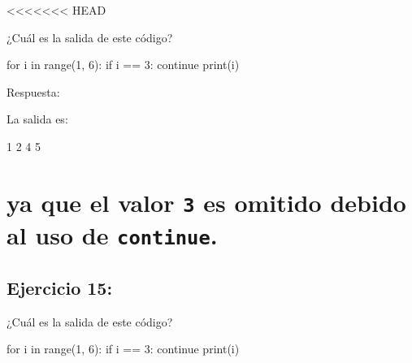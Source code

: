\documentclass[
  a4paper,
  DIV=11,
  numbers=noendperiod,
  onepage,
  openany]{scrreprt}
\newenvironment{Shaded}{\begin{snugshade}}{\end{snugshade}}
\newcommand{\BuiltInTok}[1]{\textcolor[rgb]{0.00,0.23,0.31}{#1}}
\newcommand{\ControlFlowTok}[1]{\textcolor[rgb]{0.00,0.23,0.31}{#1}}
\newcommand{\DecValTok}[1]{\textcolor[rgb]{0.68,0.00,0.00}{#1}}
\newcommand{\ExtensionTok}[1]{\textcolor[rgb]{0.00,0.23,0.31}{#1}}
\newcommand{\KeywordTok}[1]{\textcolor[rgb]{0.00,0.23,0.31}{#1}}
\newcommand{\NormalTok}[1]{\textcolor[rgb]{0.00,0.23,0.31}{#1}}
\newcommand{\OperatorTok}[1]{\textcolor[rgb]{0.37,0.37,0.37}{#1}}
\begin{document}
\textless\textless\textless\textless\textless\textless\textless{} HEAD

¿Cuál es la salida de este código?

\begin{Shaded}
\begin{Highlighting}[]
\ControlFlowTok{for}\NormalTok{ i }\KeywordTok{in} \BuiltInTok{range}\NormalTok{(}\DecValTok{1}\NormalTok{, }\DecValTok{6}\NormalTok{):}
    \ControlFlowTok{if}\NormalTok{ i }\OperatorTok{==} \DecValTok{3}\NormalTok{:}
        \ControlFlowTok{continue}
    \BuiltInTok{print}\NormalTok{(i)}
\end{Highlighting}
\end{Shaded}

Respuesta:

La salida es:

\begin{Shaded}
\begin{Highlighting}[]
\ExtensionTok{1}
\ExtensionTok{2}
\ExtensionTok{4}
\ExtensionTok{5}
\end{Highlighting}
\end{Shaded}

\hypertarget{ya-que-el-valor-3-es-omitido-debido-al-uso-de-continue.}{%
\chapter{\texorpdfstring{ya que el valor \texttt{3} es omitido debido al
uso de
\texttt{continue}.}{ya que el valor 3 es omitido debido al uso de continue.}}\label{ya-que-el-valor-3-es-omitido-debido-al-uso-de-continue.}}

\hypertarget{ejercicio-15-1}{%
\section{Ejercicio 15:}\label{ejercicio-15-1}}

¿Cuál es la salida de este código?

\begin{Shaded}
\begin{Highlighting}[]
\ControlFlowTok{for}\NormalTok{ i }\KeywordTok{in} \BuiltInTok{range}\NormalTok{(}\DecValTok{1}\NormalTok{, }\DecValTok{6}\NormalTok{):}
    \ControlFlowTok{if}\NormalTok{ i }\OperatorTok{==} \DecValTok{3}\NormalTok{:}
        \ControlFlowTok{continue}
    \BuiltInTok{print}\NormalTok{(i)}
\end{Highlighting}
\end{Shaded}
\end{document}
